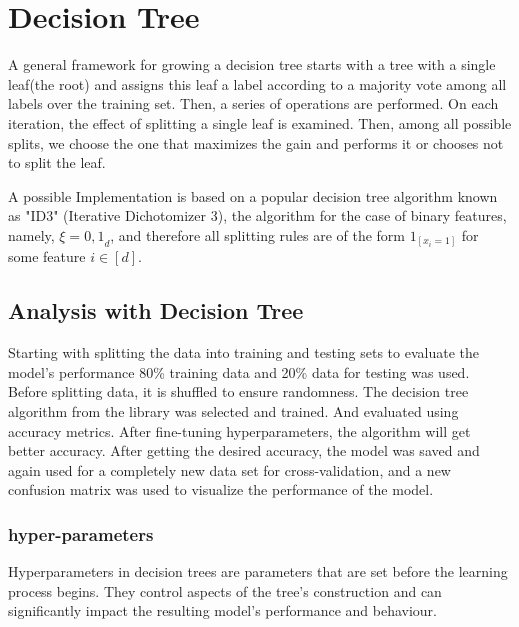 \section{Decision Tree}

A general framework for growing a decision tree starts with a tree with a single leaf(the root) and assigns this leaf a label according to a majority vote among all labels over the training set. Then, a series of operations are performed. On each iteration, the effect of splitting a single leaf is examined. Then, among all possible splits, we choose the one that maximizes the gain and performs it or chooses not to split the leaf.

A possible Implementation is based on a popular decision tree algorithm known as "ID3" (Iterative Dichotomizer 3), 
the algorithm for the case of binary features, namely, $\xi = {0,1}_{d}$, and therefore all splitting rules are of the form $1_{[x_{i}=1]}$ for some feature $i\in [d]$.

\subsection{Analysis with Decision Tree}
Starting with splitting the data into training and testing sets to evaluate the model's performance 80\% training data and 20\% data for testing was used. Before splitting data, it is shuffled to ensure randomness. The decision tree algorithm from the library was selected and trained. And evaluated using accuracy metrics. After fine-tuning hyperparameters, the algorithm will get better accuracy. After getting the desired accuracy, the model was saved and again used for a completely new data set for cross-validation, and a new confusion matrix was used to visualize the performance of the model.
\subsubsection{hyper-parameters}
Hyperparameters in decision trees are parameters that are set before the learning process begins. They control aspects of the tree's construction and can significantly impact the resulting model's performance and behaviour. 

